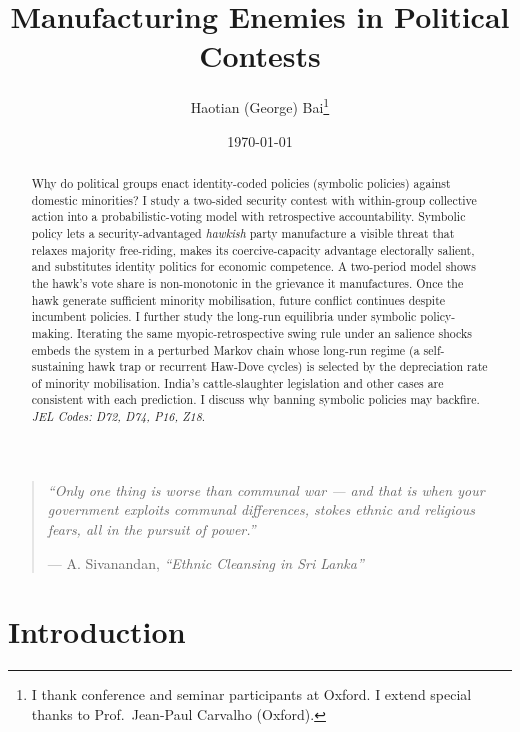 \documentclass[11pt,twoside]{extarticle}
\title{Manufacturing Enemies in Political Contests}
\author{Haotian (George) Bai\thanks{I thank conference and seminar participants at Oxford. I extend special thanks to Prof.\ Jean-Paul Carvalho (Oxford).}}
\date{\today}
\begin{document}
\maketitle

\begin{abstract}
Why do political groups enact identity-coded policies (symbolic policies) against domestic minorities? 
I study a two-sided security contest with within-group collective action into a probabilistic-voting model with retrospective accountability. Symbolic policy lets a security-advantaged \emph{hawkish} party manufacture a visible threat that relaxes majority free-riding, makes its coercive-capacity advantage electorally salient, and substitutes identity politics for economic competence. A two-period model shows the hawk's vote share is non-monotonic in the grievance it manufactures. Once the hawk generate sufficient minority mobilisation, future conflict continues despite incumbent policies. 
I further study the long-run equilibria under symbolic policy-making. Iterating the same myopic-retrospective swing rule under an salience shocks embeds the system in a perturbed Markov chain whose long-run regime (a self-sustaining hawk trap or recurrent Haw-Dove cycles) is selected by the depreciation rate of minority mobilisation. 
India's cattle-slaughter legislation and other cases are consistent with each prediction. I discuss why banning symbolic policies may backfire.\\

\emph{JEL Codes: D72, D74, P16, Z18}.

\end{abstract}
\clearpage

\begin{quote}
\textit{``Only one thing is worse than communal war --- and that is when your government exploits communal differences, stokes ethnic and religious fears, all in the pursuit of power.''}

\hfill --- A. Sivanandan, \textit{``Ethnic Cleansing in Sri Lanka''}
\end{quote}

\section{Introduction}

\end{document}
